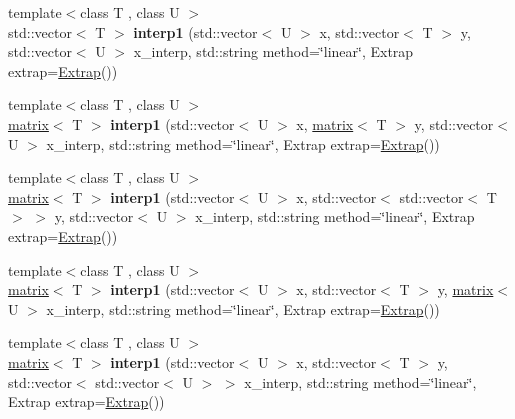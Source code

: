 \begin{DoxyCompactItemize}
\item 
\hypertarget{namespacekeycpp_a56633eb0878a0dbe6596fb0e74fdc6ea}{{\footnotesize template$<$class T , class U $>$ }\\std\-::vector$<$ T $>$ {\bfseries interp1} (std\-::vector$<$ U $>$ x, std\-::vector$<$ T $>$ y, std\-::vector$<$ U $>$ x\-\_\-interp, std\-::string method=\char`\"{}linear\char`\"{}, Extrap extrap=\hyperlink{classkeycpp_1_1_extrap}{Extrap}())}\label{namespacekeycpp_a56633eb0878a0dbe6596fb0e74fdc6ea}

\item 
\hypertarget{namespacekeycpp_ad6dfc562f4ab516d21be63ab8a9c1b23}{{\footnotesize template$<$class T , class U $>$ }\\\hyperlink{classkeycpp_1_1matrix}{matrix}$<$ T $>$ {\bfseries interp1} (std\-::vector$<$ U $>$ x, \hyperlink{classkeycpp_1_1matrix}{matrix}$<$ T $>$ y, std\-::vector$<$ U $>$ x\-\_\-interp, std\-::string method=\char`\"{}linear\char`\"{}, Extrap extrap=\hyperlink{classkeycpp_1_1_extrap}{Extrap}())}\label{namespacekeycpp_ad6dfc562f4ab516d21be63ab8a9c1b23}

\item 
\hypertarget{namespacekeycpp_a3b44770c6a8c5ba4acb6fe6ead6cc811}{{\footnotesize template$<$class T , class U $>$ }\\\hyperlink{classkeycpp_1_1matrix}{matrix}$<$ T $>$ {\bfseries interp1} (std\-::vector$<$ U $>$ x, std\-::vector$<$ std\-::vector$<$ T $>$ $>$ y, std\-::vector$<$ U $>$ x\-\_\-interp, std\-::string method=\char`\"{}linear\char`\"{}, Extrap extrap=\hyperlink{classkeycpp_1_1_extrap}{Extrap}())}\label{namespacekeycpp_a3b44770c6a8c5ba4acb6fe6ead6cc811}

\item 
\hypertarget{namespacekeycpp_ac5ab894467bbea180c9b283895d5d5d3}{{\footnotesize template$<$class T , class U $>$ }\\\hyperlink{classkeycpp_1_1matrix}{matrix}$<$ T $>$ {\bfseries interp1} (std\-::vector$<$ U $>$ x, std\-::vector$<$ T $>$ y, \hyperlink{classkeycpp_1_1matrix}{matrix}$<$ U $>$ x\-\_\-interp, std\-::string method=\char`\"{}linear\char`\"{}, Extrap extrap=\hyperlink{classkeycpp_1_1_extrap}{Extrap}())}\label{namespacekeycpp_ac5ab894467bbea180c9b283895d5d5d3}

\item 
\hypertarget{namespacekeycpp_a4c19f6ff8e0001eca5c63529bd58e664}{{\footnotesize template$<$class T , class U $>$ }\\\hyperlink{classkeycpp_1_1matrix}{matrix}$<$ T $>$ {\bfseries interp1} (std\-::vector$<$ U $>$ x, std\-::vector$<$ T $>$ y, std\-::vector$<$ std\-::vector$<$ U $>$ $>$ x\-\_\-interp, std\-::string method=\char`\"{}linear\char`\"{}, Extrap extrap=\hyperlink{classkeycpp_1_1_extrap}{Extrap}())}\label{namespacekeycpp_a4c19f6ff8e0001eca5c63529bd58e664}


\end{DoxyCompactItemize}
